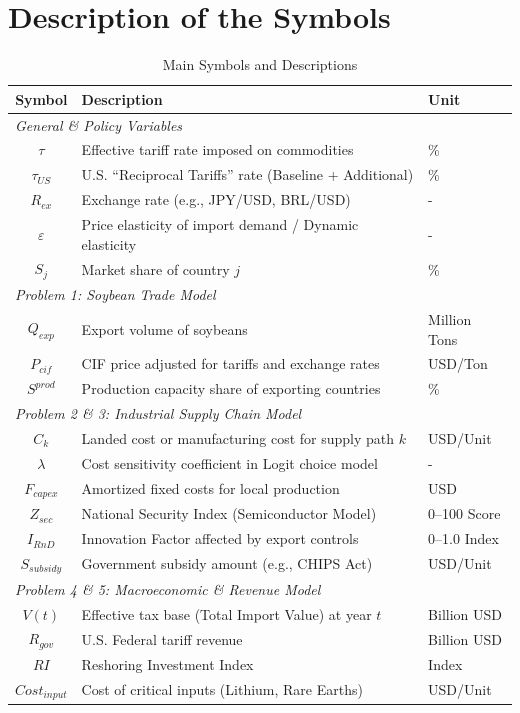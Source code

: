 \documentclass{apmcmthesis}
\begin{document}
\section{Description of the Symbols}\label{sec:symbols}

\begin{table}[H]
\centering
\caption{Main Symbols and Descriptions}
\begin{tabular}{c >{\raggedright\arraybackslash}p{9.5cm} l}
\toprule
\textbf{Symbol} & \textbf{Description} & \textbf{Unit} \\
\midrule
\multicolumn{3}{l}{\textit{General \& Policy Variables}} \\
$\tau$ & Effective tariff rate imposed on commodities & \% \\
$\tau_{US}$ & U.S. ``Reciprocal Tariffs'' rate (Baseline + Additional) & \% \\
$R_{ex}$ & Exchange rate (e.g., JPY/USD, BRL/USD) & - \\
$\varepsilon$ & Price elasticity of import demand / Dynamic elasticity & - \\
$S_j$ & Market share of country $j$ & \% \\

\midrule
\multicolumn{3}{l}{\textit{Problem 1: Soybean Trade Model}} \\
$Q_{exp}$ & Export volume of soybeans & Million Tons \\
$P_{cif}$ & CIF price adjusted for tariffs and exchange rates & USD/Ton \\
$S^{prod}$ & Production capacity share of exporting countries & \% \\

\midrule
\multicolumn{3}{l}{\textit{Problem 2 \& 3: Industrial Supply Chain Model}} \\
$C_k$ & Landed cost or manufacturing cost for supply path $k$ & USD/Unit \\
$\lambda$ & Cost sensitivity coefficient in Logit choice model & - \\
$F_{capex}$ & Amortized fixed costs for local production & USD \\
$Z_{sec}$ & National Security Index (Semiconductor Model) & 0--100 Score \\
$I_{RnD}$ & Innovation Factor affected by export controls & 0--1.0 Index \\
$S_{subsidy}$ & Government subsidy amount (e.g., CHIPS Act) & USD/Unit \\

\midrule
\multicolumn{3}{l}{\textit{Problem 4 \& 5: Macroeconomic \& Revenue Model}} \\
$V(t)$ & Effective tax base (Total Import Value) at year $t$ & Billion USD \\
$R_{gov}$ & U.S. Federal tariff revenue & Billion USD \\
$RI$ & Reshoring Investment Index & Index \\
$Cost_{input}$ & Cost of critical inputs (Lithium, Rare Earths) & USD/Unit \\
\bottomrule
\end{tabular}
\label{tab:symbols}
\end{table}
\end{document}
